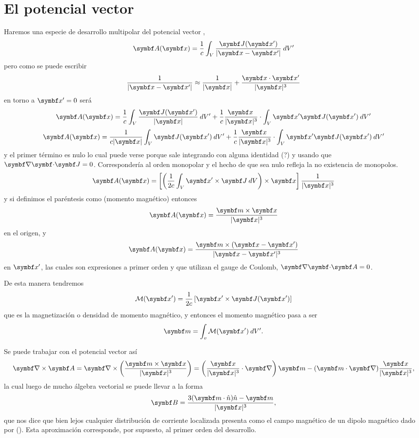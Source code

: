 \documentclass[10pt,oneside]{CBFT_book}
\begin{document}
\section{El potencial vector}

Haremos una especie de desarrollo multipolar del potencial vector ,
\[
	\vb{A}(\vb{x}) = \frac{1}{c} \int_V \frac{\vb{J}(\vb{x}')}{|\vb{x}-\vb{x}'|} \: dV' 
\]
pero como se puede escribir
\[
	\frac{1}{|\vb{x}-\vb{x}'|} \approx \frac{1}{|\vb{x}|}  + \frac{\vb{x}\cdot\vb{x}'}{|\vb{x}|^3} 
\]
en torno a $\vb{x}'=0$ será
\[
	\vb{A}(\vb{x}) = \frac{1}{c} \int_V \frac{\vb{J}(\vb{x}')}{|\vb{x}|} \: dV' 
	+ \frac{1}{c} \frac{ \vb{x} \: }{|\vb{x}|^3} \cdot \int_V \vb{x}' \vb{J}(\vb{x}') \: dV' 
\]
\[
	\vb{A}(\vb{x}) = \frac{1}{c|\vb{x}|} \int_V \vb{J}(\vb{x}') \: dV' 
	+ \frac{1}{c} \frac{ \vb{x} \: }{|\vb{x}|^3} \cdot \int_V \vb{x}' \vb{J}(\vb{x}') \: dV' 
\]
y el primer término es nulo lo cual puede verse porque sale integrando con alguna identidad (?)
y usando que $\divem{J}=0$. Correspondería al orden monopolar y el hecho de que sea nulo refleja
la no existencia de monopolos.
\[
	\vb{A}(\vb{x}) = \left[ \left(\frac{1}{2c} \int_V \vb{x}'\times \vb{J} \: dV \right) \times \vb{x} \right] 
			\frac{1}{|\vb{x}|^3}
\]
y si definimos el paréntesis como  (momento magnético) entonces
\[
	\vb{A}(\vb{x}) = \frac{\vb{m} \times \vb{x} }{|\vb{x}|^3}
\]
en el origen, y 
\[
	\vb{A}(\vb{x}) = \frac{\vb{m} \times (\vb{x}-\vb{x}') }{|\vb{x}-\vb{x}'|^3}
\]
en $\vb{x}'$, las cuales son expresiones a primer orden y que utilizan el gauge de Coulomb, $\divem{A}=0$.

De esta manera tendremos
\[
	\mathcal{M}(\vb{x}') = \frac{1}{2c} \left[ \vb{x}' \times \vb{J}(\vb{x}')\right]
\]
que es la magnetización o densidad de momento magnético, y entonces el momento magnético pasa a ser 
\[
	\vb{m} = \int_v \mathcal{M}(\vb{x}') \:dV'.
\]

Se puede trabajar con el potencial vector así
\[
	\rotorm{A}  = \Nabla \times \left( \frac{\vb{m} \times \vb{x} }{|\vb{x}|^3} \right) =
	\left( \frac{\vb{x}}{|\vb{x}|^3}\cdot\Nabla \right)\vb{m}-(\vb{m}\cdot\Nabla)\frac{\vb{x}}{|\vb{x}|^3}, 
\]
la cual luego de mucho álgebra vectorial se puede llevar a la forma
\[
	\vb{B} = \frac{3 (\vb{m}\cdot\hat{n})\hat{n} - \vb{m}}{|\vb{x}|^3},
\]
que nos dice que bien lejos cualquier distribución de corriente localizada presenta como  el 
campo magnético de un dipolo magnético dado por (). Esta aproximación corresponde, por 
supuesto, al primer orden del desarrollo.
\end{document}
